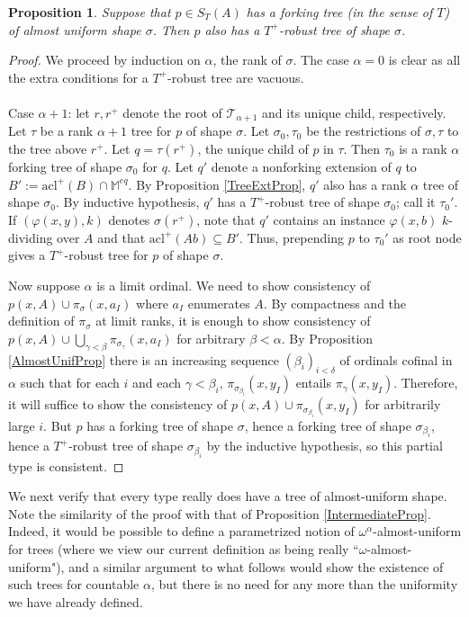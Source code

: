 \documentclass{article}
\newtheorem{prop}[theorem]{Proposition}
\theoremstyle{remark}
\theoremstyle{definition}
\begin{document}
\begin{prop}\label{StarProp2}
    Suppose that $p\in S_T(A)$ has a forking tree (in the sense of $T$) of almost uniform shape $\sigma$. Then $p$ also has  a $T^+$-robust tree of shape $\sigma$.
\end{prop}
\begin{proof}
    We proceed by induction on $\alpha$, the rank of $\sigma$. The case $\alpha=0$ is clear as all the extra conditions for a $T^+$-robust tree are vacuous.\\
    \\
    \noindent Case $\alpha+1$: let $r,r^+$ denote the root of $\mathcal{T}_{\alpha+1}$ and its unique child, respectively. Let $\tau$ be a rank $\alpha+1$ tree for $p$ of shape $\sigma$. Let $\sigma_0,\tau_0$ be the restrictions of $\sigma,\tau$ to the tree above $r^+$. Let $q=\tau(r^+)$, the unique child of $p$ in $\tau$. Then $\tau_0$ is a rank $\alpha$ forking tree of shape $\sigma_0$ for $q$. Let $q'$ denote a nonforking extension of $q$ to $B':=\mathrm{acl}^+(B)\cap \mathbb{M}^{eq}$. By Proposition \ref{TreeExtProp}, $q'$ also has a rank $\alpha$ tree of shape $\sigma_0$. By inductive hypothesis, $q'$ has a $T^+$-robust tree of shape $\sigma_0$; call it $\tau_0'$. If $(\varphi(x,y),k)$ denotes $\sigma(r^+)$, note that $q'$ contains an instance $\varphi(x,b)$ $k$-dividing over $A$ and that $\mathrm{acl}^+(Ab)\subseteq B'$. Thus, prepending $p$ to $\tau_0'$ as root node gives a $T^+$-robust tree for $p$ of shape $\sigma$.
    
    Now suppose $\alpha$ is a limit ordinal. We need to show consistency of $p(x,A)\cup \pi_\sigma(x,a_I)$ where $a_I$ enumerates $A$. By compactness and the definition of $\pi_\sigma$ at limit ranks, it is enough to show consistency of $p(x,A)\cup \bigcup_{\gamma<\beta}\pi_{\sigma_\gamma}(x,a_I)$ for arbitrary $\beta<\alpha$. By Proposition \ref{AlmostUnifProp} there is an increasing sequence $(\beta_i)_{i<\delta}$ of ordinals cofinal in $\alpha$ such that for each $i$ and each $\gamma<\beta_i$, $\pi_{\sigma_{\beta_i}}(x,y_I)$ entails $\pi_\gamma(x,y_I)$. Therefore, it will suffice to show the consistency of $p(x,A)\cup \pi_{\sigma_{\beta_{i}}}(x,y_I)$ for arbitrarily large $i$. But $p$ has a forking tree of shape $\sigma$, hence a forking tree of shape $\sigma_{\beta_i}$, hence a $T^+$-robust tree of shape $\sigma_{\beta_i}$ by the inductive hypothesis, so this partial type is consistent.
\end{proof}

We next verify that every type really does have a tree of almost-uniform shape. Note the similarity of the proof with that of Proposition \ref{IntermediateProp}. Indeed, it would be possible to define a parametrized notion of $\omega^\alpha$-almost-uniform for trees (where we view our current definition as being really ``$\omega$-almost-uniform"), and a similar argument to what follows would show the existence of such trees for countable $\alpha$, but there is no need for any more than the uniformity we have already defined.
\end{document}
